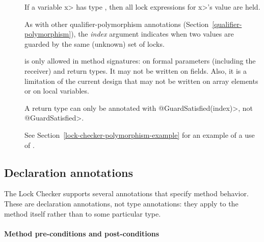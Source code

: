 \begin{description}

\item[]
  If a variable \<x> has type , then all
  lock expressions for \<x>'s value are held.

  As with other qualifier-polymorphism annotations
  (Section~\ref{qualifier-polymorphism}), the \emph{index} argument
  indicates when two values are guarded by the same (unknown) set of locks.

   is only allowed in method signatures:  on
  formal parameters (including the receiver) and return types.
  It may not be written on fields.  Also, it is a limitation of the
  current design that  may not be written on
  array elements or on local variables.

  A return type can only be annotated with \<@GuardSatisfied(index)>,
  not \<@GuardSatisfied>.

  See Section~\ref{lock-checker-polymorphism-example}
  for an example of a use of .


\end{description}


\subsection{Declaration annotations\label{lock-declaration-annotations}}

The Lock Checker supports several annotations that specify method behavior.
These are declaration annotations, not type annotations: they apply to the
method itself rather than to some particular type.

\paragraph{Method pre-conditions and post-conditions\label{lock-method-pre-post-conditions}}

